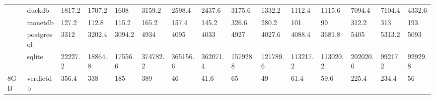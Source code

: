 \begin{table}[]
\begin{tabular}{ll|lllllllllllll}
                      & duckdb     & 1817.2                      & 1707.2                      & 1608                        & 3159.2                      & 2598.4                      & 2437.6                      & 3175.6                      & 1332.2                       & 1112.4                      & 1115.6                      & 7094.4                      & 7104.4                                              & 4332.6                                              \\
                      & monetdb    & 127.2                       & 112.8                       & 115.2                       & 165.2                       & 157.4                       & 145.2                       & 326.6                       & 280.2                        & 101                         & {\color[HTML]{009901} 99}   & 312.2                       & 313                                                 & 193                                                 \\
                      & postgresql & 3312                        & 3202.4                      & 3094.2                      & 4934                        & 4095                        & 4033                        & 4927                        & 4027.6                       & 4088.4                      & 3681.8                      & 5405                        & 5313.2                                              & 5093                                                \\
                      & sqlite     & 22227.2                     & 18864.8                     & 17556.6                     & 374782.2                    & 365156.6                    & 362071.4                    & 157928.8                    & 121789.6                     & 113217.2                    & 113020.2                    & 202020.6                    & 99217.2                                             & 92929.8                                             \\
\multirow{-5}{*}{8GB} & verdictdb  & 356.4                       & 338                         & 185                         & 389                         & {\color[HTML]{009901} 46}   & {\color[HTML]{009901} 41.6} & {\color[HTML]{009901} 65}   & {\color[HTML]{009901} 49}    & {\color[HTML]{009901} 61.4} & {\color[HTML]{009901} 59.6} & 225.4                       & 234.4                                               & {\color[HTML]{009901} 56}                          
\end{tabular}
\end{table}
